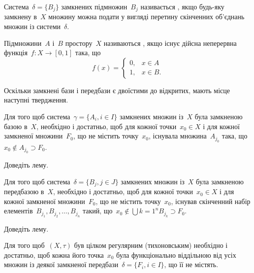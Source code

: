 \begin{definition}
Система~$\delta = \{B_j\}$ замкнених підмножин~$B_j$ називається , якщо будь-яку замкнену в~$X$ множину можна
подати у вигляді перетину скінченних об'єднань множин із
системи~$\delta$.
\end{definition}

\begin{definition}
Підмножини~$A$ і~$B$ простору~$X$ називаються
, якщо існує дійсна неперервна
функція~$f: X \to [0, 1]$ така, що \[ f(x) = \begin{cases} 0, & x \in A \\ 1, & x \in B. \end{cases} \]
\end{definition}

Оскільки замкнені бази і передбази є двоїстими до
відкритих, мають місце наступні твердження.

\begin{lemma}
Для того щоб система~$\gamma = \{A_i, i \in I\}$
замкнених множин із~$X$ була замкненою базою в~$X$,
необхідно і достатньо, щоб для кожної точки~$x_0 \in X$ і для
кожної замкненої множини~$F_0$, що не містить точку~$x_0$,
існувала множина~$A_{j_0}$ така, що~$x_0 \notin A_{j_0} \supset F_0$.
\end{lemma}

\begin{exercise}
Доведіть лему.
\end{exercise}

\begin{lemma}
Для того щоб система~$\delta = \{B_j, j \in J\}$
замкнених множин із~$X$ була замкненою передбазою в~$X$,
необхідно і достатньо, щоб для кожної точки~$x_0 \in X$ і для
кожної замкненої множини~$F_0$, що не містить точку~$x_0$,
існував скінченний набір елементів~$B_{j_1}, B_{j_2}, \ldots, B_{j_n}$
такий, що~$x_0 \notin \bigcup{k = 1}^n B_{j_k} \supset F_0$.
\end{lemma}

\begin{exercise}
Доведіть лему.
\end{exercise}

\begin{theorem}
Для того щоб~$(X, \tau)$ був цілком регулярним (тихоновським)
необхідно і достатньо, щоб кожна його точка~$x_0$ була
функціонально віддільною від усіх множин із деякої
замкненої передбази~$\delta = \{F_i, i \in I\}$, що її не містять.
\end{theorem}


